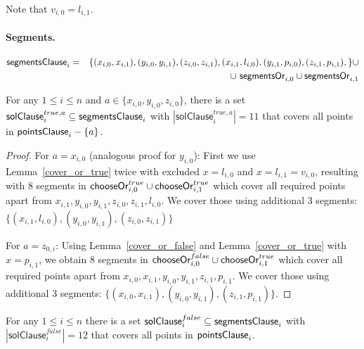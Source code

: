 Note that $v_{i,0} = l_{i,1}$.

\paragraph{Segments.}

\begin{eqnarray*}
\mathsf{segmentsClause}_i & = & \{ (x_{i, 0}, x_{i, 1}),
(y_{i, 0}, y_{i, 1}),
(z_{i, 0}, z_{i, 1}),
(x_{i, 1}, l_{i, 0}),
(y_{i, 1}, p_{i, 0}),
(z_{i, 1}, p_{i, 1}),
\} \cup \\
& & \cup \ \mathsf{segmentsOr}_{i,0} \cup \mathsf{segmentsOr}_{i,1}
\end{eqnarray*}

\newcommand{\segmentsClauseSolTrue}[1]{\mathsf{solClause}^{true,#1}}
\newcommand{\segmentsClauseSolFalse}{\mathsf{solClause}^{false}}

\begin{lemma}
\label{cover_clauses_solution_true}
For any $1 \le i \le n$ and $a \in \{ x_{i, 0}, y_{i, 0}, z_{i, 0}\}$,
there is a set $\segmentsClauseSolTrue{a}_i \subseteq \segmentsClause_i$
with $|\segmentsClauseSolTrue{a}_i| = 11$
that covers all points in $\mathsf{pointsClause}_i - \{a\}$.
\end{lemma}

\begin{proof}
For $a = x_{i, 0}$ (analogous proof for $y_{i, 0}$):
First we use Lemma~\ref{cover_or_true} twice with excluded $x = l_{i, 0}$ and
$x = l_{i, 1} = v_{i, 0}$,
resulting with 8 segments in $\mathsf{chooseOr}^{true}_{i,0} \cup \mathsf{chooseOr}^{true}_{i,1}$
which cover all required points apart from
$x_{i, 1}, y_{i, 0}, y_{i, 1}, z_{i, 0}, z_{i, 1}, l_{i, 0}$.
We cover those using additional 3 segments:
$\{ (x_{i, 1}, l_{i, 0}), (y_{i, 0}, y_{i, 1}),
(z_{i, 0}, z_{i, 1}) \}$

For $a = z_{0, i}$:
Using Lemma~\ref{cover_or_false} and Lemma~\ref{cover_or_true} with
$x = p_{i, 1}$,
we obtain 8 segments in $\mathsf{chooseOr}^{false}_{i,0} \cup \mathsf{chooseOr}^{true}_{i,1}$
which cover all required points apart from
$x_{i, 0}, x_{i, 1}, y_{i, 0}, y_{i, 1}, z_{i, 1}, p_{i, 1}$.
We cover those using additional 3 segments:
$\{ (x_{i, 0}, x_{i, 1}), (y_{i, 0}, y_{i, 1}),
(z_{i, 1}, p_{i, 1}) \}$.
\end{proof}

\begin{lemma}
\label{cover_clauses_solution_false}
For any $1 \le i \le n$ there is
a set $\segmentsClauseSolFalse_i \subseteq \segmentsClause_i$
with $|\segmentsClauseSolFalse_i| = 12$
that covers all points in $\mathsf{pointsClause}_i$.
\end{lemma}

